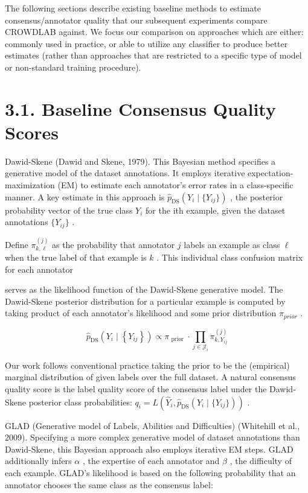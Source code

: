 \documentclass[
]{article}
\begin{document}
The following sections describe existing baseline methods to estimate
consensus/annotator quality that our subsequent experiments compare
CROWDLAB against. We focus our comparison on approaches which are
either: commonly used in practice, or able to utilize any classifier to
produce better estimates (rather than approaches that are restricted to
a specific type of model or non-standard training procedure).

\section{3.1. Baseline Consensus Quality
Scores}\label{baseline-consensus-quality-scores}

Dawid-Skene (Dawid and Skene, 1979). This Bayesian method specifies a
generative model of the dataset annotations. It employs iterative
expectation-maximization (EM) to estimate each annotator's error rates
in a class-specific manner. A key estimate in this approach is
\(\widehat{p}_{\mathrm{DS}}(Y_{i} \mid \{Y_{ij}\})\) , the posterior
probability vector of the true class \(Y_{i}\) for the ith example,
given the dataset annotations \(\{Y_{ij}\}\) .

Define \(\pi_{k,\ell}^{(j)}\) as the probability that annotator \(j\)
labels an example as class \(\ell\) when the true label of that example
is \(k\) . This individual class confusion matrix for each annotator

serves as the likelihood function of the Dawid-Skene generative model.
The Dawid-Skene posterior distribution for a particular example is
computed by taking product of each annotator's likelihood and some prior
distribution \(\pi_{prior}\) .

\[
\widehat {p} _ {\mathrm{DS}} \left(Y _ {i} \mid \left\{Y _ {i j} \right\}\right) \propto \pi_ {\text { prior }} \cdot \prod_ {j \in \mathcal {J} _ {i}} \pi_ {k, Y _ {i j}} ^ {(j)} \tag {15}
\]

Our work follows conventional practice taking the prior to be the
(empirical) marginal distribution of given labels over the full dataset.
A natural consensus quality score is the label quality score of the
consensus label under the Dawid-Skene posterior class probabilities:
\(q_{i} = L(\widehat{Y}_{i}, \widehat{p}_{\mathrm{DS}}(Y_{i} \mid \{Y_{ij}\}))\)
.

GLAD (Generative model of Labels, Abilities and Difficulties) (Whitehill
et al., 2009). Specifying a more complex generative model of dataset
annotations than Dawid-Skene, this Bayesian approach also employs
iterative EM steps. GLAD additionally infers \(\alpha\) , the expertise
of each annotator and \(\beta\) , the difficulty of each example. GLAD's
likelihood is based on the following probability that an annotator
chooses the same class as the consensus label:
\end{document}
